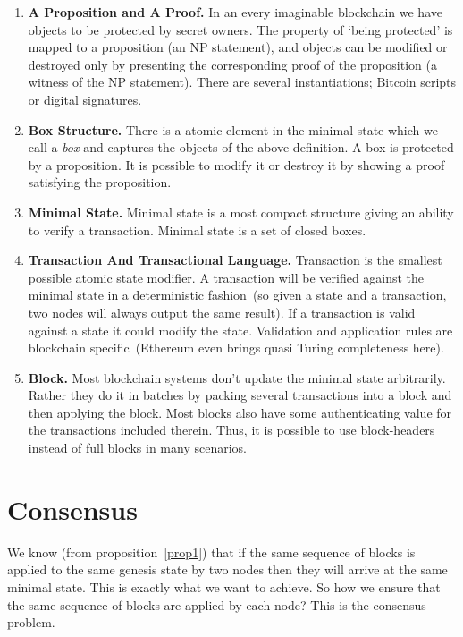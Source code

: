 \documentclass[]{report}   %
\begin{document}
\begin{enumerate}
\item{\textbf{A Proposition and A Proof.}}
In an every imaginable blockchain we have objects to be protected by secret owners. The property of `being protected' is mapped to a proposition (an NP statement), and objects can be modified or destroyed only by presenting the corresponding proof of the proposition (a witness of the NP statement). There are several instantiations; Bitcoin scripts or digital signatures. 
\item{\textbf{Box Structure.}}
There is a atomic element in the minimal state which we call a \textit{box} and captures the objects of the above definition. A box is protected by a proposition. It is possible to modify it or destroy it by showing a proof satisfying the proposition. 
\item{\textbf{Minimal State.}}
Minimal state is a most compact structure giving an ability to verify a transaction. Minimal state is a set of closed boxes. 
\item{\textbf{Transaction And Transactional Language.}}
Transaction is the smallest possible atomic state modifier. A transaction will be verified against the minimal state in a deterministic fashion~(so given a state and a transaction, two nodes will always output the same result). If a transaction is valid against a state it could modify the state. Validation and application rules are blockchain specific~(Ethereum even brings quasi Turing completeness here).
\item{\textbf{Block.}}
Most blockchain systems don't update the minimal state arbitrarily. Rather they do it in batches by packing several transactions into a block and then applying the block. 
Most blocks also have some authenticating value for the transactions included therein. Thus, it is possible to use block-headers instead of full blocks in many scenarios. %
\end{enumerate}



\section{Consensus}

We know (from proposition~\ref{prop1}) that if the same sequence of blocks is applied to the same genesis state by two nodes then they will arrive at the same minimal state. This is exactly what we want to achieve. So how we ensure that the same sequence of blocks are applied by each node? This is the consensus problem.
\end{document}

